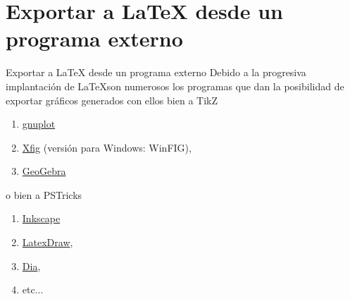 \documentclass[10pt]{beamer}
\begin{document}

\section{Exportar a \LaTeX{}  desde un programa externo}

\begin{frame}{Exportar a \LaTeX{} desde un programa externo}
Debido a la progresiva implantaci\'on de \LaTeX  son  numerosos los programas que 
dan la posibilidad de exportar gr\'aficos  generados con ellos bien a TikZ
\begin{enumerate}
\item \href{https://ctan.org/pkg/gnuplottex}{\color{blue} gnuplot}
\item \href{https://mcj.sourceforge.net/latex_and_xfig.html}{\color{blue} Xfig} {\small (versi\'on para Windows: WinFIG)}, 
\item \href{http://www.geogebra.org/cms/}{\color{blue} GeoGebra}

\end{enumerate}
o bien a PSTricks
\begin{enumerate}
\item  \href{https://inkscape-manuals.readthedocs.io/en/latest/export-other-formats.html}{\color{blue} Inkscape}
\item \href{http://latexdraw.sourceforge.net}{\color{blue} LatexDraw},
\item \href{http://dia-installer.de/index.html.en}{\color{blue} Dia},
\item etc...
\end{enumerate}
\end{frame}
\end{document}
